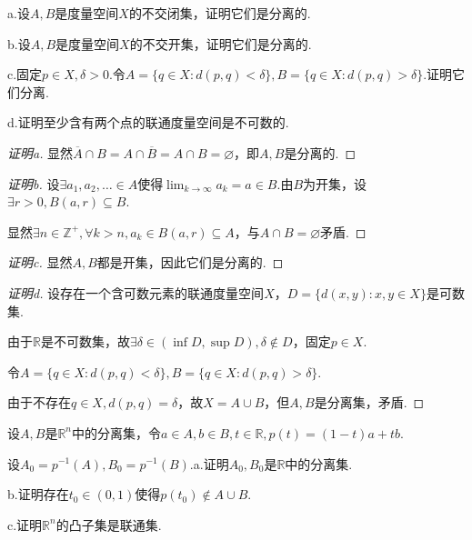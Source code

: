 \begin{problem}[19]\label{1.B.19}
    a.设\(A,B\)是度量空间\(X\)的不交闭集，证明它们是分离的.

    b.设\(A,B\)是度量空间\(X\)的不交开集，证明它们是分离的.

    c.固定\(p \in X, \delta>0\).令\(A=\{q \in X: d(p,q)<\delta\}, B=\{q \in X: d(p,q)>\delta\}\).证明它们分离.

    d.证明至少含有两个点的联通度量空间是不可数的.
\end{problem}

\begin{proof}[证明a]
    显然\(\overline{A} \cap B=A \cap \overline{B}=A \cap B=\varnothing\)，即\(A,B\)是分离的.
\end{proof}

\begin{proof}[证明b]
    设\(\exists a_1, a_2, \dots \in A\)使得\(\lim_{k \to \infty}a_k=a \in B\).由\(B\)为开集，设\(\exists r>0, B(a,r) \subseteq B\).

    显然\(\exists n \in \mathbb{Z}^+, \forall k>n, a_k \in B(a,r) \subseteq A\)，与\(A \cap B=\varnothing\)矛盾.
\end{proof}

\begin{proof}[证明c]
    显然\(A,B\)都是开集，因此它们是分离的.
\end{proof}

\begin{proof}[证明d]
    设存在一个{\kaishu 含可数元素的联通度量空间}\(X\)，\(D=\{d(x,y): x,y \in X\}\)是可数集.

    由于\(\mathbb{R}\)是不可数集，故\(\exists \delta \in (\inf D, \sup D), \delta \notin D\)，固定\(p \in X\).

    令\(A=\{q \in X: d(p,q)<\delta\}, B=\{q \in X: d(p,q)>\delta\}\).
    
    由于不存在\(q \in X, d(p,q)=\delta\)，故\(X=A \cup B\)，但\(A,B\)是分离集，矛盾.
\end{proof}

\begin{problem}[21]\label{1.B.21}
    设\(A,B\)是\(\mathbb{R}^n\)中的分离集，令\(a \in A, b \in B, t \in \mathbb{R}, p(t)=(1-t)a+tb\).

    设\(A_0=p^{-1}(A), B_0=p^{-1}(B)\).a.证明\(A_0,B_0\)是\(\mathbb{R}\)中的分离集.

    b.证明存在\(t_0 \in (0,1)\)使得\(p(t_0) \notin A \cup B\).

    c.证明\(\mathbb{R}^n\)的凸子集是联通集.
\end{problem}

